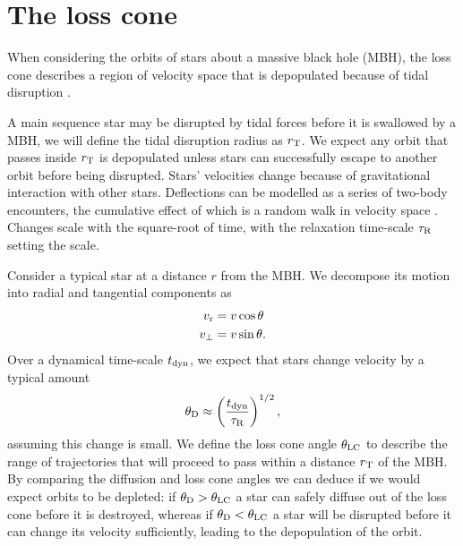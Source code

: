\chapter{The loss cone}

When considering the orbits of stars about a massive black hole (MBH), the loss cone describes a region of velocity space that is depopulated because of tidal disruption \citep{Frank1976,Lightman1977}.

A main sequence star may be disrupted by tidal forces before it is swallowed by a MBH, we will define the tidal disruption radius as $r_\mathrm{T}$. We expect any orbit that passes inside $r_\mathrm{T}$ is depopulated unless stars can successfully escape to another orbit before being disrupted. Stars' velocities change because of gravitational interaction with other stars. Deflections can be modelled as a series of two-body encounters, the cumulative effect of which is a random walk in velocity space \citep[chapter 2]{Chandrasekhar1960}. Changes scale with the square-root of time, with the relaxation time-scale $\tau_\mathrm{R}$ setting the scale.

Consider a typical star at a distance $r$ from the MBH. We decompose its motion into radial and tangential components as
\begin{subequations}
\begin{align}
v_\mathrm{r} = {} & v\cos \theta \\
v_\perp = {} & v\sin \theta.
\end{align}
\end{subequations}
Over a dynamical time-scale $t_\mathrm{dyn}$, we expect that stars change velocity by a typical amount
\begin{equation}
\theta_\mathrm{D} \approx \left(\frac{t_\mathrm{dyn}}{\tau_\mathrm{R}}\right)^{1/2},
\end{equation}
assuming this change is small. We define the loss cone angle $\theta_\mathrm{LC}$ to describe the range of trajectories that will proceed to pass within a distance $r_\mathrm{T}$ of the MBH. By comparing the diffusion and loss cone angles we can deduce if we would expect orbits to be depleted: if $\theta_\mathrm{D} > \theta_\mathrm{LC}$ a star can safely diffuse out of the loss cone before it is destroyed, whereas if $\theta_\mathrm{D} < \theta_\mathrm{LC}$ a star will be disrupted before it can change its velocity sufficiently, leading to the depopulation of the orbit.


